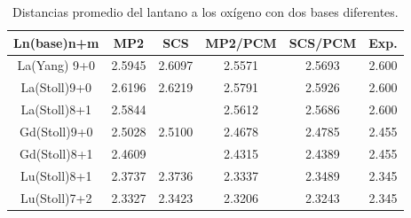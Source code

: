 \begin{table}[h!]
\centering
\caption{\footnotesize Distancias promedio del lantano a los 
ox\'igeno con dos bases diferentes.}
\begin{tabular}{c|cccc|c}\hline\hline
Ln(base)n+m  & MP2    & SCS    & MP2/PCM & SCS/PCM & Exp.  \\ \hline
La(Yang) 9+0 & 2.5945 & 2.6097 & 2.5571  & 2.5693  & 2.600 \\ 
La(Stoll)9+0 & 2.6196 & 2.6219 & 2.5791  & 2.5926  & 2.600 \\ 
La(Stoll)8+1 & 2.5844 &        & 2.5612  & 2.5686  & 2.600 \\ 
Gd(Stoll)9+0 & 2.5028 & 2.5100 & 2.4678  & 2.4785  & 2.455 \\ 
Gd(Stoll)8+1 & 2.4609 &        & 2.4315  & 2.4389  & 2.455 \\ 
Lu(Stoll)8+1 & 2.3737 & 2.3736 & 2.3337  & 2.3489  & 2.345 \\ 
Lu(Stoll)7+2 & 2.3327 & 2.3423 & 2.3206  & 2.3243  & 2.345 \\ 
\hline \end{tabular}\label{t3}\end{table}

